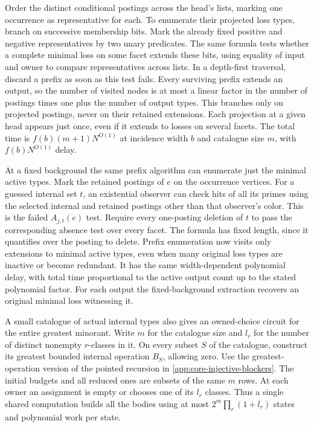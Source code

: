 Order the distinct conditional postings
across the head's lists, marking one
occurrence as representative for each. To enumerate
their projected loss types, branch on
successive membership bits. Mark the
already fixed positive and negative
representatives by two unary predicates.
The same formula tests whether a complete
minimal loss on some facet extends these
bits, using equality of input and owner
to compare representatives across lists. In a
depth-first traversal, discard a prefix
as soon as this test fails. Every surviving
prefix extends an output, so the number
of visited nodes is at most a linear
factor in the number of postings times
one plus the number of output types.
This branches only on projected postings,
never on their retained extensions.
Each projection at a given head appears
just once, even if it extends to losses
on several facets. The total time is
$f(b)(m+1)N^{O(1)}$ at incidence width
$b$ and catalogue size $m$, with
$f(b)N^{O(1)}$ delay.

At a fixed background the same prefix
algorithm can enumerate just the minimal
active types. Mark the retained postings
of $e$ on the occurrence vertices.
For a guessed internal set $t$, an
existential observer can check hits of
all its primes using the selected internal
and retained postings other than that
observer's color. This is the failed
$A_{j,t}(e)$ test. Require every one-posting
deletion of $t$ to pass the corresponding
absence test over every facet. The formula
has fixed length, since it quantifies over
the posting to delete. Prefix enumeration
now visits only extensions to minimal
active types, even when many original loss
types are inactive or become redundant.
It has the same width-dependent polynomial
delay, with total time proportional to the
active output count up to the stated
polynomial factor. For each output the
fixed-background extraction recovers an
original minimal loss witnessing it.

A small catalogue of actual internal types
also gives an owned-choice circuit for the
entire greatest minorant. Write $m$ for
the catalogue size and $l_r$ for the number
of distinct nonempty $r$-classes in it.
On every subset $S$ of the catalogue,
construct its greatest bounded internal
operation $B_S$, allowing zero. Use the
greatest-operation version of the pointed
recursion in \cref{app:core-injective-blockers}.
The initial budgets and all reduced ones
are subsets of the same $m$ rows. At each
owner an assignment is empty or chooses
one of its $l_r$ classes. Thus a single
shared computation builds all the bodies
using at most $2^m\prod_r(1+l_r)$ states
and polynomial work per state.

